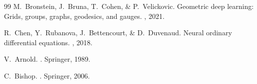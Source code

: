 \documentclass[11pt,a4paper,twocolumn]{article}
\begin{document}
\begin{thebibliography}{99}
M.~Bronstein, J.~Bruna, T.~Cohen, \& P.~Velickovic.
\newblock Geometric deep learning: Grids, groups, graphs, geodesics, and gauges.
, 2021.

R.~Chen, Y.~Rubanova, J.~Bettencourt, \& D.~Duvenaud.
\newblock Neural ordinary differential equations.
, 2018.

V.~Arnold.
.
\newblock Springer, 1989.

C.~Bishop.
.
\newblock Springer, 2006.

\end{thebibliography}
\end{document}
